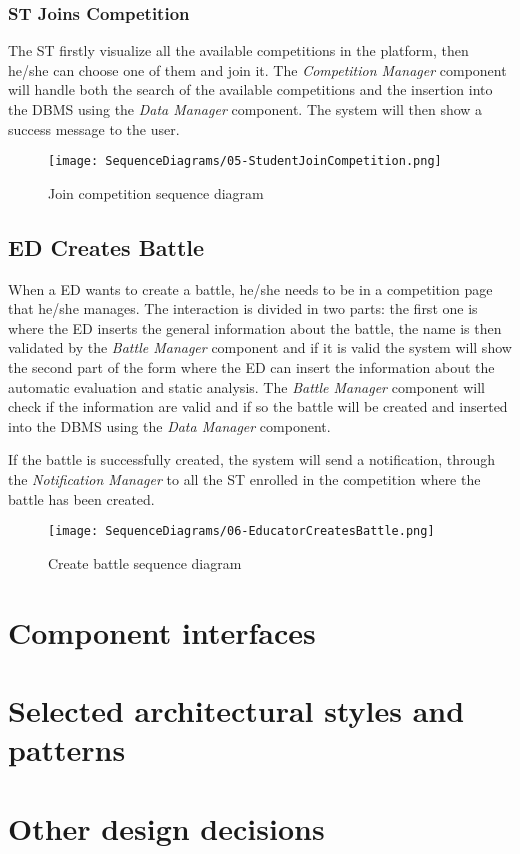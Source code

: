 \subsubsection*{ST Joins Competition}
\label{ss:join_competition_diagram}
The ST firstly visualize all the available competitions in the platform, then he/she can choose one of them and join it. The \textit{Competition Manager} component will handle both the search of the available competitions and the insertion into the DBMS using the \textit{Data Manager} component. The system will then show a success message to the user.

\begin{figure}[H]
  \centering
  \texttt{[image: SequenceDiagrams/05-StudentJoinCompetition.png]}
  \caption{Join competition sequence diagram}
  \label{fig:join_competition_diagramn}
\end{figure}

\subsection*{ED Creates Battle}
\label{ss:create_battle_diagram}
When a ED wants to create a battle, he/she needs to be in a competition page that he/she manages. The interaction is divided in two parts: the first one is where the ED inserts the general information about the battle, the name is then validated by the \textit{Battle Manager} component and if it is valid the system will show the second part of the form where the ED can insert the information about the automatic evaluation and static analysis. The \textit{Battle Manager} component will check if the information are valid and if so the battle will be created and inserted into the DBMS using the \textit{Data Manager} component.

If the battle is successfully created, the system will send a notification, through the \textit{Notification Manager} to all the ST enrolled in the competition where the battle has been created.

\begin{figure}[H]
  \centering
  \texttt{[image: SequenceDiagrams/06-EducatorCreatesBattle.png]}
  \caption{Create battle sequence diagram}
  \label{fig:create_battle_diagramn}
\end{figure}

\section{Component interfaces}
\label{s:component-interfaces}%

\section{Selected architectural styles and patterns}
\label{s:selected-architectural-styles-and-patterns}%

\section{Other design decisions}
\label{s:other-design-decisions}%
